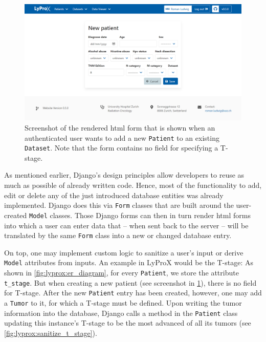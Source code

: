 \documentclass[\relativeRoot/main.tex]{subfiles}
\begin{document}
\begin{figure}
    \centering
    \includegraphics[width=1.0\textwidth, frame]{figures/new_patient.png}
    \caption[
        Screenshot of the form for adding new patients
    ]{
        Screenshot of the rendered \acrshort{html} form that is shown when an authenticated user wants to add a new \texttt{Patient} to an existing \texttt{Dataset}. Note that the form contains no field for specifying a T-stage.
    }
    \label{fig:lyprox:new_patient}
\end{figure}

As mentioned earlier, Django's design principles allow developers to reuse as much as possible of already written code. Hence, most of the functionality to add, edit or delete any of the just introduced database entities was already implemented. Django does this via \texttt{Form} classes that are built around the user-created \texttt{Model} classes. Those Django forms can then in turn render \acrshort{html} forms into which a user can enter data that -- when sent back to the server -- will be translated by the same \texttt{Form} class into a new or changed database entry.

On top, one may implement custom logic to sanitize a user's input or derive \texttt{Model} attributes from inputs. An example in LyProX would be the T-stage: As shown in \cref{fig:lyprox:er_diagram}, for every \texttt{Patient}, we store the attribute \texttt{t\_stage}. But when creating a new patient (see screenshot in \cref{fig:lyprox:new_patient}), there is no field for T-stage. After the new \texttt{Patient} entry has been created, however, one may add a \texttt{Tumor} to it, for which a T-stage must be defined. Upon writing the tumor information into the database, Django calls a method in the \texttt{Patient} class updating this instance's T-stage to be the most advanced of all its tumors (see \cref{fig:lyprox:sanitize_t_stage}).
\end{document}
